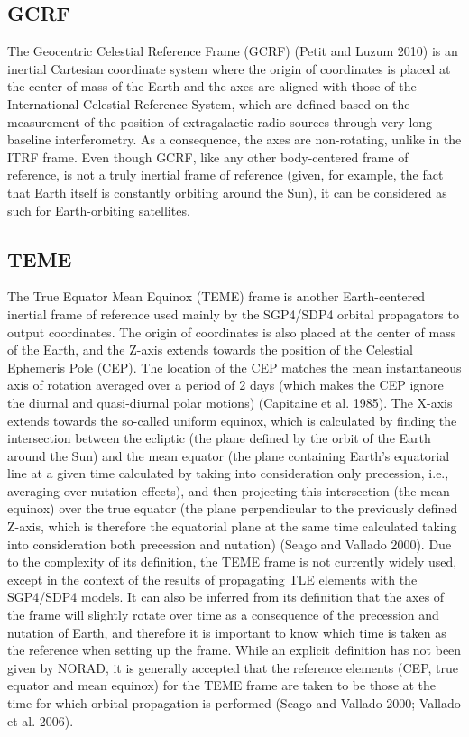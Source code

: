 \hypertarget{gcrf}{%
\subsection{GCRF}\label{gcrf}}

The Geocentric Celestial Reference Frame (GCRF) (Petit and Luzum 2010) is an inertial Cartesian coordinate system where the origin of coordinates is placed at the center of mass of the Earth and the axes are aligned with those of the International Celestial Reference System, which are defined based on the measurement of the position of extragalactic radio sources through very-long baseline interferometry. As a consequence, the axes are non-rotating, unlike in the ITRF frame. Even though GCRF, like any other body-centered frame of reference, is not a truly inertial frame of reference (given, for example, the fact that Earth itself is constantly orbiting around the Sun), it can be considered as such for Earth-orbiting satellites.

\hypertarget{teme}{%
\subsection{TEME}\label{teme}}

The True Equator Mean Equinox (TEME) frame is another Earth-centered inertial frame of reference used mainly by the SGP4/SDP4 orbital propagators to output coordinates. The origin of coordinates is also placed at the center of mass of the Earth, and the Z-axis extends towards the position of the Celestial Ephemeris Pole (CEP). The location of the CEP matches the mean instantaneous axis of rotation averaged over a period of 2 days (which makes the CEP ignore the diurnal and quasi-diurnal polar motions) (Capitaine et al. 1985). The X-axis extends towards the so-called uniform equinox, which is calculated by finding the intersection between the ecliptic (the plane defined by the orbit of the Earth around the Sun) and the mean equator (the plane containing Earth's equatorial line at a given time calculated by taking into consideration only precession, i.e., averaging over nutation effects), and then projecting this intersection (the mean equinox) over the true equator (the plane perpendicular to the previously defined Z-axis, which is therefore the equatorial plane at the same time calculated taking into consideration both precession and nutation) (Seago and Vallado 2000). Due to the complexity of its definition, the TEME frame is not currently widely used, except in the context of the results of propagating TLE elements with the SGP4/SDP4 models. It can also be inferred from its definition that the axes of the frame will slightly rotate over time as a consequence of the precession and nutation of Earth, and therefore it is important to know which time is taken as the reference when setting up the frame. While an explicit definition has not been given by NORAD, it is generally accepted that the reference elements (CEP, true equator and mean equinox) for the TEME frame are taken to be those at the time for which orbital propagation is performed (Seago and Vallado 2000; Vallado et al. 2006).

